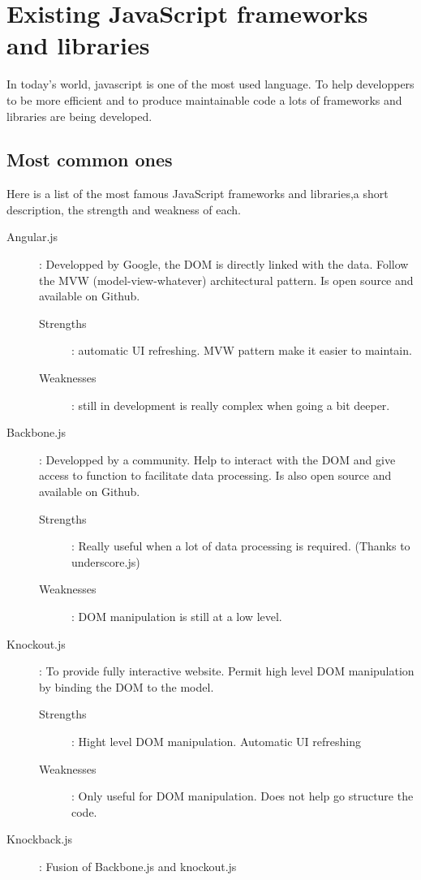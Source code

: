 \documentclass[12pt]{report}%
\begin{document}
\section{Existing JavaScript frameworks and libraries}
In today's world, javascript is one of the most used language. To help developpers to be more efficient and to produce maintainable code a lots of frameworks and libraries are being developed. 

\subsection{Most common ones}
Here is a list of the most famous JavaScript frameworks and libraries,a short description,  the strength and weakness of each.

\begin{description}
	\item[Angular.js] : Developped by Google, the DOM is directly linked with the data. Follow the MVW (model-view-whatever) architectural pattern. Is open source and available on Github. \begin{description}
		\item[Strengths] : automatic UI refreshing. MVW pattern make it easier to maintain.
		\item[Weaknesses] : still in development is really complex when going a bit deeper.
	\end{description}
	\item[Backbone.js] : Developped by a community. Help to interact with the DOM and give access to function to facilitate data processing. Is also open source and available on Github. \begin{description}
		\item[Strengths] : Really useful when a lot of data processing is required. (Thanks to underscore.js)
		\item[Weaknesses] : DOM manipulation is still at a low level.
	\end{description}
	\item[Knockout.js] : To provide fully interactive website. Permit high level DOM manipulation by binding the DOM to the model. \begin{description}
	\item[Strengths] : Hight level DOM manipulation. Automatic UI refreshing
	\item[Weaknesses] : Only useful for DOM manipulation. Does not help go structure the code. 
	\end{description}
	\item[Knockback.js] : Fusion of Backbone.js and knockout.js \begin{description}

\end{description}
\end{description}
\end{document}
